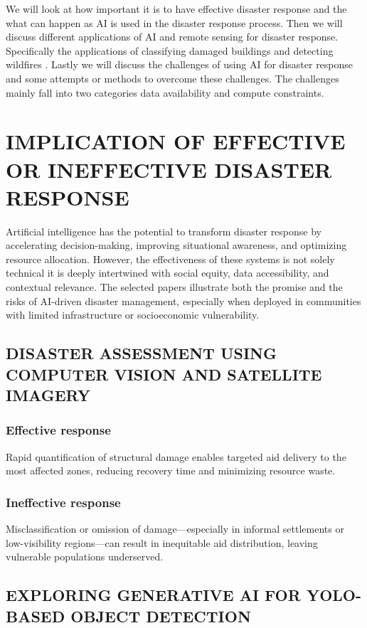 \documentclass[conference,a4paper]{IEEEtran}
\begin{document}
We will look at how important it is to have effective disaster response and the what can happen as AI is used in the disaster response process. Then we will discuss different applications of AI and remote sensing for disaster response. Specifically the applications of classifying damaged buildings \cite{kimDisasterAssessmentUsing2022,teohExploringGenerativeAI2024,lagapEnhancingPostDisasterDamage2025} and detecting wildfires \cite{elbohy2025fusion,jiaoForestFirePatterns2023}. Lastly we will discuss the challenges of using AI for disaster response and some attempts or methods to overcome these challenges. The challenges mainly fall into two categories data availability and compute constraints.


\section{IMPLICATION OF EFFECTIVE OR INEFFECTIVE DISASTER RESPONSE}
Artificial intelligence has the potential to transform disaster response by accelerating decision-making, improving situational awareness, and optimizing resource allocation. However, the effectiveness of these systems is not solely technical it is deeply intertwined with social equity, data accessibility, and contextual relevance. The selected papers illustrate both the promise and the risks of AI-driven disaster management, especially when deployed in communities with limited infrastructure or socioeconomic vulnerability.
\subsection{DISASTER ASSESSMENT USING COMPUTER VISION AND SATELLITE IMAGERY}
\subsubsection{Effective response}
Rapid quantification of structural damage enables targeted aid delivery to the most affected zones, reducing recovery time and minimizing resource waste.
\subsubsection{Ineffective response}
Misclassification or omission of damage—especially in informal settlements or low-visibility regions—can result in inequitable aid distribution, leaving vulnerable populations underserved.
\subsection{EXPLORING GENERATIVE AI FOR YOLO-BASED OBJECT DETECTION}
\end{document}
